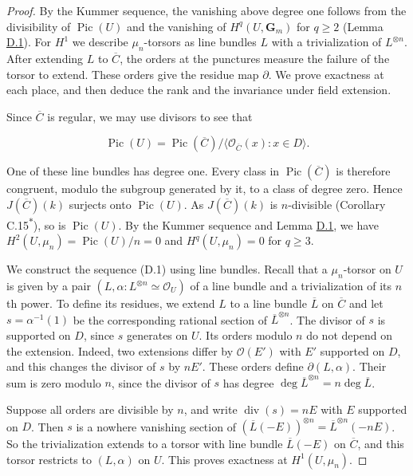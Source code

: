 \documentclass[11pt]{article}
\newcommand{\bpout}[1]{#1\textsuperscript{\hyperlink{bp-outside}{\ensuremath{\ast}}}}
\begin{document}
\begin{proof}[{Proof}]\label{bp14}%
By the Kummer sequence, the vanishing above degree one follows from the divisibility of \(\operatorname{Pic}(U)\) and the vanishing of \(H^q(U,\mathbf G_m)\) for \(q\geq2\) (Lemma \hyperref[bp5]{D.1}). For \(H^1\) we describe \(\mu_n\)-torsors as line bundles \(L\) with a trivialization of \(L^{\otimes n}\). After extending \(L\) to \(\overline C\), the orders at the punctures measure the failure of the torsor to extend. These orders give the residue map \(\partial\). We prove exactness at each place, and then deduce the rank and the invariance under field extension.

Since \(\overline C\) is regular, we may use divisors to see that

\[
\operatorname{Pic}(U)=\operatorname{Pic}(\overline C)/
\langle\mathcal O_{\overline C}(x):x\in D\rangle.
\]

One of these line bundles has degree one. Every class in \(\operatorname{Pic}(\overline C)\) is therefore congruent, modulo the subgroup generated by it, to a class of degree zero. Hence \(J(\overline C)(k)\) surjects onto \(\operatorname{Pic}(U)\). As \(J(\overline C)(k)\) is \(n\)-divisible (Corollary \bpout{C.15}), so is \(\operatorname{Pic}(U)\). By the Kummer sequence and Lemma \hyperref[bp5]{D.1}, we have \(H^2(U,\mu_n)=\operatorname{Pic}(U)/n=0\) and \(H^q(U,\mu_n)=0\) for \(q\geq3\).

We construct the sequence (D.1) using line bundles.  Recall that a \(\mu_n\)-torsor on \(U\) is given by a pair \((L,\alpha:L^{\otimes n}\simeq\mathcal O_U)\) of a line bundle and a trivialization of its \(n\)th power.  To define its residues, we extend \(L\) to a line bundle \(\overline L\) on \(\overline C\) and let \(s=\alpha^{-1}(1)\) be the corresponding rational section of \(\overline L^{\otimes n}\).  The divisor of \(s\) is supported on \(D\), since \(s\) generates on \(U\). Its orders modulo \(n\) do not depend on the extension. Indeed, two extensions differ by \(\mathcal O(E')\) with \(E'\) supported on \(D\), and this changes the divisor of \(s\) by \(nE'\). These orders define \(\partial(L,\alpha)\). Their sum is zero modulo \(n\), since the divisor of \(s\) has degree \(\deg\overline L^{\otimes n}=n\deg\overline L\).

Suppose all orders are divisible by \(n\), and write \(\operatorname{div}(s)=nE\) with \(E\) supported on \(D\). Then \(s\) is a nowhere vanishing section of \((\overline L(-E))^{\otimes n}=\overline L^{\otimes n}(-nE)\). So the trivialization extends to a torsor with line bundle \(\overline L(-E)\) on \(\overline C\), and this torsor restricts to \((L,\alpha)\) on \(U\). This proves exactness at \(H^1(U,\mu_n)\).


\end{proof}
\end{document}
